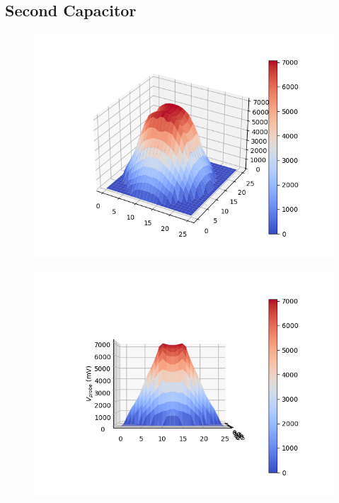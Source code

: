 \documentclass[10pt, twocolumn]{article}
\theoremstyle{definition}
\begin{document}
\subsection{Second Capacitor}
\begin{figure}
  \centering
  \begin{minipage}{.5\textwidth}
    \centering
    \includegraphics[width=\linewidth]{hplot.png}
    \label{fig:ppc-results}
  \end{minipage}%
  \hspace{.1\textwidth}%
  \begin{minipage}{.5\textwidth}
    \centering
    \includegraphics[width=\linewidth]{hplot-sideon.png}

\end{minipage}
\end{figure}
\end{document}
